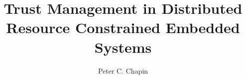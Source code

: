 \documentclass[11pt]{report}
\newcommand{\primaryspacing}{\doublespace}
\begin{document}
\title{Trust Management in Distributed\\Resource Constrained Embedded Systems}
\author{Peter C. Chapin}
\maketitle

\makeacceptance
{}





\singlespace

\tableofcontents
\clearpage

\listoftables
\clearpage

\listoffigures
\clearpage

%

\primaryspacing
{}









\appendix

%






\primaryspacing

%
\end{document}
